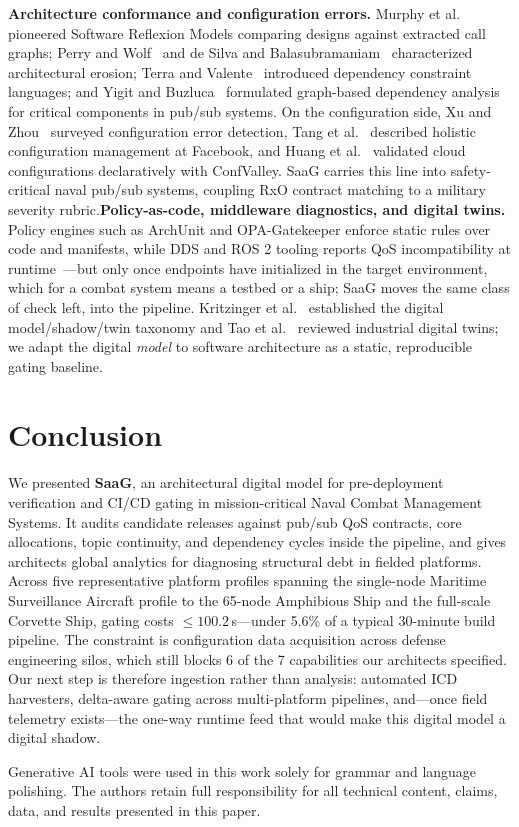\documentclass[sigconf,9pt]{acmart}
\begin{document}
\noindent\textbf{Architecture conformance and configuration errors.} Murphy et al.~\cite{murphy2001} pioneered Software Reflexion Models comparing designs against extracted call graphs; Perry and Wolf~\cite{perry1992} and de Silva and Balasubramaniam~\cite{desilva2012} characterized architectural erosion; Terra and Valente~\cite{terra2014} introduced dependency constraint languages; and Yigit and Buzluca~\cite{yigit2025graph} formulated graph-based dependency analysis for critical components in pub/sub systems. On the configuration side, Xu and Zhou~\cite{xu2015} surveyed configuration error detection, Tang et al.~\cite{tang2015} described holistic configuration management at Facebook, and Huang et al.~\cite{huang2015} validated cloud configurations declaratively with ConfValley. SaaG carries this line into safety-critical naval pub/sub systems, coupling RxO contract matching to a military severity rubric.\noindent\textbf{Policy-as-code, middleware diagnostics, and digital twins.} Policy engines such as ArchUnit and OPA-Gatekeeper enforce static rules over code and manifests, while DDS and ROS 2 tooling reports QoS incompatibility at runtime~\cite{omg2015dds}---but only once endpoints have initialized in the target environment, which for a combat system means a testbed or a ship; SaaG moves the same class of check left, into the pipeline. Kritzinger et al.~\cite{kritzinger2018} established the digital model/shadow/twin taxonomy and Tao et al.~\cite{tao2019digital} reviewed industrial digital twins; we adapt the digital \emph{model} to software architecture as a static, reproducible gating baseline.

\section{Conclusion} 
We presented \textbf{SaaG}, an architectural digital model for pre-deployment verification and CI/CD gating in mission-critical Naval Combat Management Systems. It audits candidate releases against pub/sub QoS contracts, core allocations, topic continuity, and dependency cycles inside the pipeline, and gives architects global analytics for diagnosing structural debt in fielded platforms. Across five representative platform profiles spanning the single-node Maritime Surveillance Aircraft profile to the 65-node Amphibious Ship and the full-scale Corvette Ship, gating costs $\le 100.2$\,s---under 5.6\% of a typical 30-minute build pipeline. The constraint is configuration data acquisition across defense engineering silos, which still blocks 6 of the 7 capabilities our architects specified. Our next step is therefore ingestion rather than analysis: automated ICD harvesters, delta-aware gating across multi-platform pipelines, and---once field telemetry exists---the one-way runtime feed that would make this digital model a digital shadow.

\begin{acks}
Generative AI tools were used in this work solely for grammar and language polishing. The authors retain full responsibility for all technical content, claims, data, and results presented in this paper.
\end{acks}


 
\end{document}
